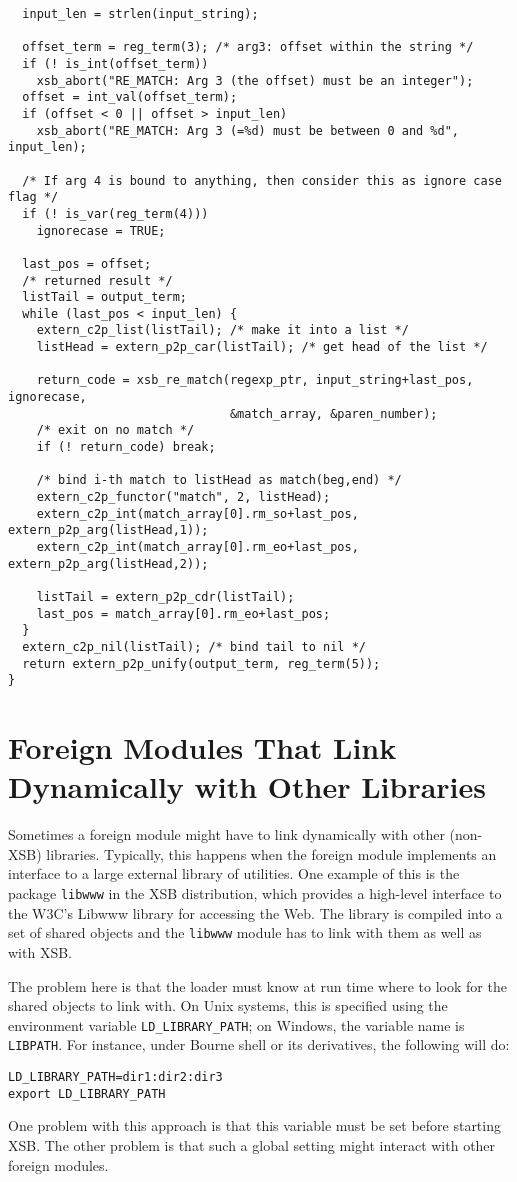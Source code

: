 {\begin{verbatim}
  input_len = strlen(input_string);
  
  offset_term = reg_term(3); /* arg3: offset within the string */
  if (! is_int(offset_term))
    xsb_abort("RE_MATCH: Arg 3 (the offset) must be an integer");
  offset = int_val(offset_term);
  if (offset < 0 || offset > input_len)
    xsb_abort("RE_MATCH: Arg 3 (=%d) must be between 0 and %d", input_len);

  /* If arg 4 is bound to anything, then consider this as ignore case flag */
  if (! is_var(reg_term(4)))
    ignorecase = TRUE;

  last_pos = offset;
  /* returned result */
  listTail = output_term;
  while (last_pos < input_len) {
    extern_c2p_list(listTail); /* make it into a list */
    listHead = extern_p2p_car(listTail); /* get head of the list */

    return_code = xsb_re_match(regexp_ptr, input_string+last_pos, ignorecase,
                               &match_array, &paren_number);
    /* exit on no match */
    if (! return_code) break;

    /* bind i-th match to listHead as match(beg,end) */
    extern_c2p_functor("match", 2, listHead);
    extern_c2p_int(match_array[0].rm_so+last_pos, extern_p2p_arg(listHead,1));
    extern_c2p_int(match_array[0].rm_eo+last_pos, extern_p2p_arg(listHead,2));

    listTail = extern_p2p_cdr(listTail);
    last_pos = match_array[0].rm_eo+last_pos;
  }
  extern_c2p_nil(listTail); /* bind tail to nil */
  return extern_p2p_unify(output_term, reg_term(5));
}
\end{verbatim}
}

\section{Foreign Modules That Link Dynamically with Other Libraries}

Sometimes a foreign module might have to link dynamically with other
(non-XSB) libraries. Typically, this happens when the foreign module
implements an interface to a large external library of utilities.
One example of this is the package {\tt libwww} in the XSB distribution,
which provides a high-level interface to the W3C's Libwww library for
accessing the Web. The library is compiled into a set of shared objects and
the {\tt libwww} module has to link with them as well as with XSB.

The problem here is that the loader must know at run time where to look for
the shared objects to link with. On Unix systems, this is specified using
the environment variable {\tt LD\_LIBRARY\_PATH}; on Windows, the variable
name is {\tt LIBPATH}. For instance, 
under Bourne shell or its derivatives, the following will do:
\begin{verbatim}
LD_LIBRARY_PATH=dir1:dir2:dir3
export LD_LIBRARY_PATH
\end{verbatim}
One problem with this approach is that this variable must be set before
starting XSB. The other problem is that such a global setting might
interact with other foreign modules.

